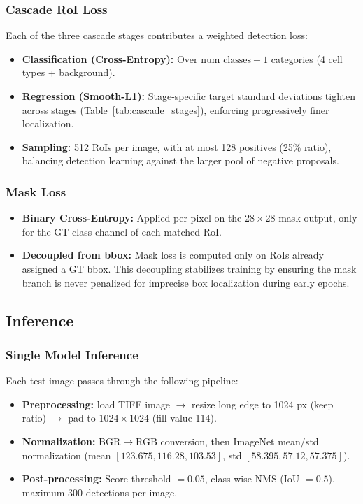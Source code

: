 \documentclass[a4paper]{article} %
\begin{document}
\subsubsection{Cascade RoI Loss}

Each of the three cascade stages contributes a weighted detection loss:
\begin{itemize}
    \item \textbf{Classification (Cross-Entropy):} Over $\text{num\_classes} + 1$ categories (4 cell types + background).
    \item \textbf{Regression (Smooth-L1):} Stage-specific target standard deviations tighten across stages (Table~\ref{tab:cascade_stages}), enforcing progressively finer localization.
    \item \textbf{Sampling:} 512 RoIs per image, with at most 128 positives (25\% ratio), balancing detection learning against the larger pool of negative proposals.
\end{itemize}

\subsubsection{Mask Loss}

\begin{itemize}
    \item \textbf{Binary Cross-Entropy:} Applied per-pixel on the $28\times28$ mask output, only for the GT class channel of each matched RoI.
    \item \textbf{Decoupled from bbox:} Mask loss is computed only on RoIs already assigned a GT bbox. This decoupling stabilizes training by ensuring the mask branch is never penalized for imprecise box localization during early epochs.
\end{itemize}

\subsection{Inference}

\subsubsection{Single Model Inference}

Each test image passes through the following pipeline:
\begin{itemize}
    \item \textbf{Preprocessing:} load TIFF image $\rightarrow$ resize long edge to 1024 px (keep ratio) $\rightarrow$ pad to $1024\times1024$ (fill value 114).
    \item \textbf{Normalization:} BGR$\rightarrow$RGB conversion, then ImageNet mean/std normalization (mean $[123.675, 116.28, 103.53]$, std $[58.395, 57.12, 57.375]$).
    \item \textbf{Post-processing:} Score threshold $= 0.05$, class-wise NMS (IoU $= 0.5$), maximum 300 detections per image.
\end{itemize}
\end{document}
